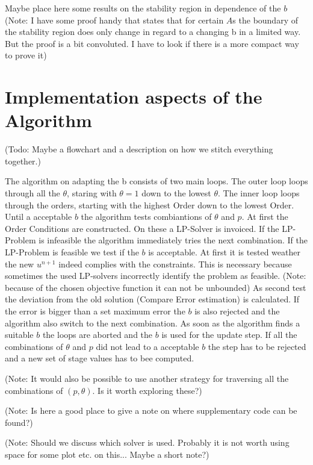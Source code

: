 \documentclass{article}
\begin{document}
Maybe place here some results on the stability region in dependence of the $b$
(Note: I have some proof handy that states that for certain $A$s the boundary of the stability region does only change in regard to a changing b in a limited way. But the proof is a bit convoluted. I have to look if there is a more compact way to prove it)






\section{Implementation aspects of the Algorithm}

(Todo: Maybe a flowchart and a description on how we stitch everything together.) 

The algorithm on adapting the b consists of two main loops. The outer loop loops through all the $\theta$, staring with $\theta = 1$ down to the lowest $\theta$. The inner loop loops through the orders, starting with the highest Order down to the lowest Order. 
Until a acceptable $b$ the algorithm tests combiantions of $\theta$ and $p$. At first the Order Conditions are constructed. On these a LP-Solver is invoiced. If the LP-Problem is infeasible the algorithm immediately tries the next combination. If the LP-Problem is feasible we test if the $b$ is acceptable. At first it is tested weather the new $u^{n+1}$ indeed complies with the constraints. This is necessary because sometimes the used LP-solvers incorrectly identify the problem as feasible. (Note: because of the chosen objective function it can not be unbounded) As second test the deviation from the old solution (Compare Error estimation) is calculated. If the error is bigger than a set maximum error the $b$ is also rejected and the algorithm also switch to the next combination.
As soon as the algorithm finds a suitable $b$ the loops are aborted and the $b$ is used for the update step.
If all the combinations of $\theta$ and $p$ did not lead to a acceptable $b$ the step has to be rejected and a new set of stage values has to bee computed.

(Note: It would also be possible to use another strategy for traversing all the combinations of $(p,\theta)$. Is it worth exploring these?)

(Note: Is here a good place to give a note on where supplementary code can be found?)

(Note: Should we discuss which solver is used. Probably it is not worth using space for some plot etc. on this... Maybe a short note?)
\end{document}

